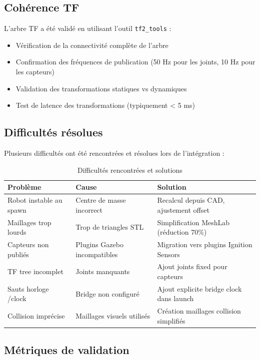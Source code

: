 \documentclass[a4paper,12pt]{report}
\begin{document}
\subsection{Cohérence TF}

L'arbre TF a été validé en utilisant l'outil \texttt{tf2\_tools} :

\begin{itemize}
    \item Vérification de la connectivité complète de l'arbre
    \item Confirmation des fréquences de publication (50 Hz pour les joints, 10 Hz pour les capteurs)
    \item Validation des transformations statiques vs dynamiques
    \item Test de latence des transformations (typiquement < 5 ms)
\end{itemize}

\subsection{Difficultés résolues}

Plusieurs difficultés ont été rencontrées et résolues lors de l'intégration :

\begin{table}[htbp]
\centering
\caption{Difficultés rencontrées et solutions}
\begin{tabular}{@{}llp{6cm}@{}}
\toprule
\textbf{Problème} & \textbf{Cause} & \textbf{Solution} \\
\midrule
Robot instable au spawn & Centre de masse incorrect & Recalcul depuis CAD, ajustement offset \\
Maillages trop lourds & Trop de triangles STL & Simplification MeshLab (réduction 70\%) \\
Capteurs non publiés & Plugins Gazebo incompatibles & Migration vers plugins Ignition Sensors \\
TF tree incomplet & Joints manquants & Ajout joints fixed pour capteurs \\
Sauts horloge /clock & Bridge non configuré & Ajout explicite bridge clock dans launch \\
Collision imprécise & Maillages visuels utilisés & Création maillages collision simplifiés \\
\bottomrule
\end{tabular}
\end{table}

\subsection{Métriques de validation}
\end{document}
